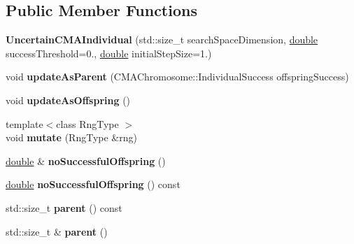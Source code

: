 \subsection*{Public Member Functions}
\begin{DoxyCompactItemize}
\item 
{\bfseries Uncertain\+C\+M\+A\+Individual} (std\+::size\+\_\+t search\+Space\+Dimension, \hyperlink{classdouble}{double} success\+Threshold=0., \hyperlink{classdouble}{double} initial\+Step\+Size=1.)\hypertarget{classUncertainCMAIndividual_abf338f5078bc8573fa792d8b835fc392}{}\label{classUncertainCMAIndividual_abf338f5078bc8573fa792d8b835fc392}

\item 
void {\bfseries update\+As\+Parent} (C\+M\+A\+Chromosome\+::\+Individual\+Success offspring\+Success)\hypertarget{classUncertainCMAIndividual_a006cffa2c76af07125e0cabd63c2fe97}{}\label{classUncertainCMAIndividual_a006cffa2c76af07125e0cabd63c2fe97}

\item 
void {\bfseries update\+As\+Offspring} ()\hypertarget{classUncertainCMAIndividual_a1037685ff79c0a9ca0e68094b2cbc5d2}{}\label{classUncertainCMAIndividual_a1037685ff79c0a9ca0e68094b2cbc5d2}

\item 
{\footnotesize template$<$class Rng\+Type $>$ }\\void {\bfseries mutate} (Rng\+Type \&rng)\hypertarget{classUncertainCMAIndividual_a35abeb318365c142c071df96cc2b7f61}{}\label{classUncertainCMAIndividual_a35abeb318365c142c071df96cc2b7f61}

\item 
\hyperlink{classdouble}{double} \& {\bfseries no\+Successful\+Offspring} ()\hypertarget{classUncertainCMAIndividual_aa30a61d73c1bcef208483284748f79f0}{}\label{classUncertainCMAIndividual_aa30a61d73c1bcef208483284748f79f0}

\item 
\hyperlink{classdouble}{double} {\bfseries no\+Successful\+Offspring} () const \hypertarget{classUncertainCMAIndividual_a21f0b5ac2d49c560fa07c43379fb6c3b}{}\label{classUncertainCMAIndividual_a21f0b5ac2d49c560fa07c43379fb6c3b}

\item 
std\+::size\+\_\+t {\bfseries parent} () const \hypertarget{classUncertainCMAIndividual_aa82e76b06c6c2b6c93baa1d132b240c8}{}\label{classUncertainCMAIndividual_aa82e76b06c6c2b6c93baa1d132b240c8}

\item 
std\+::size\+\_\+t \& {\bfseries parent} ()\hypertarget{classUncertainCMAIndividual_ab83f2353bef6499c2ec5cc190c6deb7f}{}\label{classUncertainCMAIndividual_ab83f2353bef6499c2ec5cc190c6deb7f}


\end{DoxyCompactItemize}
